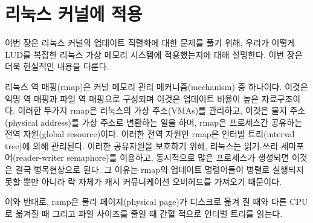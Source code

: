 \newpage
\section{리눅스 커널에 적용}
\label{sec:linux}



이번 장은 리눅스 커널의 업데이트 직렬화에 대한 문제를 풀기 위해,
우리가 어떻게 LUD를 복잡한 리눅스 가상 메모리 시스템에 적용했는지에 대해 설명한다.
이번 장은 더욱 현실적인 내용을 다룬다.

리눅스 역 매핑(rmap)은 커널 메모리 관리 메커니즘(mechanism) 중 하나이다.
이것은 익명 역 매핑과 파일 역 매핑으로 구성되며 이것은 업데이트 비율이 높은 자료구조이다.
이러한 두가지 rmap은 리눅스의 가상 주소(VMAs)를 관리하고, 이것은 물지 주소(physical address)를 
가상 주소로 변환하는 일을 하며, rmap은 프로세스간 공유하는 전역 자원(global resource)이다.
이러한 전역 자원인 rmap은 인터벌 트리(interval tree)에 의해 관리된다.
이러한 공유자원을 보호하기 위해, 리눅스는 읽기-쓰리 세마포어(reader-writer semaphore)를 이용하고, 
동시적으로 많은 프로세스가 생성되면 이것은 결국 병목현상으로 된다. 
그 이유는 rmap의 업데이트 명령어들이 병렬로 실행되지 못할 뿐만 아니라 락 자체가 캐시
커뮤니케이션 오버헤드를 가져오기 때문이다.

이와 반대로, ramp은 물리 페이지(physical page)가 디스크로 옮겨 질 때와 다른 CPU로 옮겨질 때 그리고 
파일 사이즈를 줄일 때 간혈 적으로 인터벌 트리를 읽는다.

